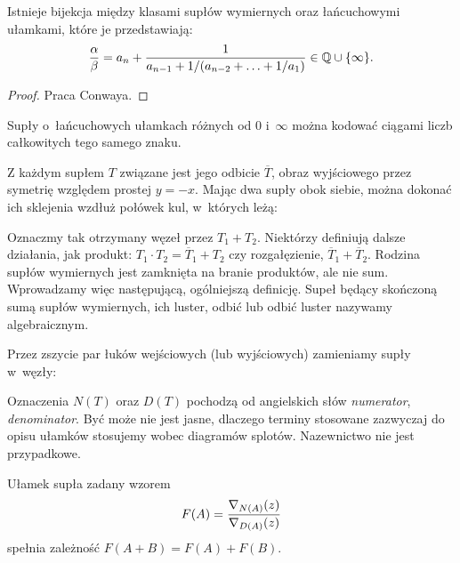 \begin{proposition}
\label{prp:continued_fractions}
    Istnieje bijekcja między klasami supłów wymiernych oraz łańcuchowymi ułamkami, które je przedstawiają:
    \[
        \frac \alpha \beta = a_n + \frac{1}{a_{n-1} + 1 / (a_{n-2} +  \ldots + 1/a_1)} \in \mathbb Q \cup \{\infty\}.
    \]
\end{proposition}

\begin{proof}
    Praca \cite{conway70} Conwaya.
\end{proof}

\begin{proposition}
\label{prp:continued_fractions_2}
    Supły o~łańcuchowych ułamkach różnych od $0$ i~$\infty$ można kodować ciągami liczb całkowitych tego samego znaku.
\end{proposition}

Z każdym supłem $T$ związane jest jego odbicie $\overline T$, obraz wyjściowego przez symetrię względem prostej $y = -x$.
Mając dwa supły obok siebie, można dokonać ich sklejenia wzdłuż połówek kul, w~których leżą:


Oznaczmy tak otrzymany węzeł przez $T_1 + T_2$.
Niektórzy definiują dalsze działania, jak produkt: $T_1 \cdot T_2 = \overline T_1 + T_2$ czy rozgałęzienie, $\overline T_1 + \overline T_2$.
Rodzina supłów wymiernych jest zamknięta na branie produktów, ale nie sum.
Wprowadzamy więc następującą, ogólniejszą definicję.
Supeł będący skończoną sumą supłów wymiernych, ich luster, odbić lub odbić luster nazywamy algebraicznym.

\begin{definition}
    \label{conway_notation}
\end{definition}

Przez zszycie par łuków wejściowych (lub wyjściowych) zamieniamy supły w~węzły:


Oznaczenia $N(T)$ oraz $D(T)$ pochodzą od angielskich słów \emph{numerator}, \emph{denominator}.
Być może nie jest jasne, dlaczego terminy stosowane zazwyczaj do opisu ułamków stosujemy wobec diagramów splotów.
Nazewnictwo nie jest przypadkowe. %
\begin{proposition}
\label{prp:knot_fraction}
    Ułamek supła zadany wzorem
    \[
        F(A) = \frac{\nabla_{N(A)}(z)}{\nabla_{D(A)}(z)}
    \]
    spełnia zależność $F(A+B) = F(A) + F(B)$.
\end{proposition}

